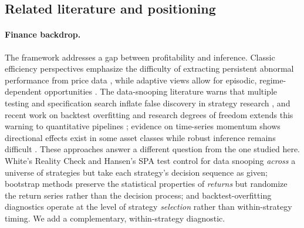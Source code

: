 \documentclass[preprint,12pt]{elsarticle}
\theoremstyle{definition}
\begin{document}
\subsection{Related literature and positioning}

\paragraph{Finance backdrop.} The framework addresses a gap between profitability and inference. Classic efficiency perspectives emphasize the difficulty of extracting persistent abnormal performance from price data \cite{fama1970}, while adaptive views allow for episodic, regime-dependent opportunities \cite{lo2004}. The data-snooping literature warns that multiple testing and specification search inflate false discovery in strategy research \cite{white2000,hansen2005,sullivan1999}, and recent work on backtest overfitting and research degrees of freedom extends this warning to quantitative pipelines \cite{bailey2017,baileylopez2014,lopezdeprado2018}; evidence on time-series momentum shows directional effects exist in some asset classes while robust inference remains difficult \cite{moskowitz2012}. These approaches answer a different question from the one studied here. White's Reality Check \cite{white2000} and Hansen's SPA test \cite{hansen2005} control for data snooping \emph{across} a universe of strategies but take each strategy's decision sequence as given; bootstrap methods \cite{politisromano1994,Kunsch1989} preserve the statistical properties of \emph{returns} but randomize the return series rather than the decision process; and backtest-overfitting diagnostics \cite{bailey2017} operate at the level of strategy \emph{selection} rather than within-strategy timing. We add a complementary, within-strategy diagnostic.
\end{document}
